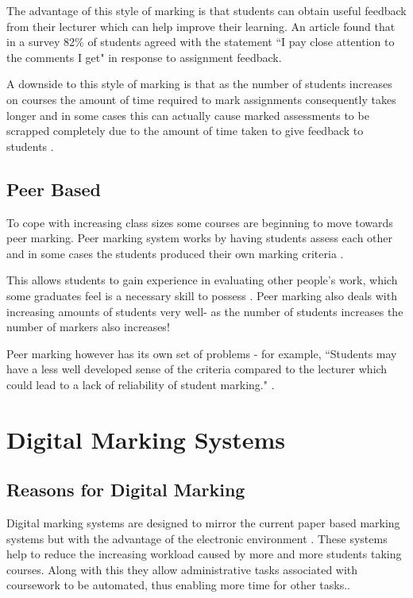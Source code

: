 \documentclass[11pt]{report}
\begin{document}
The advantage of this style of marking is that students can obtain useful feedback from their lecturer which can help improve their learning.  An article \cite{higgins_conscientious_2002-1} found that in a survey 82\% of students agreed with the statement ``I pay close attention to the comments I get" in response to assignment feedback.

A downside to this style of marking is that as the number of students increases on courses the amount of time required to mark assignments consequently takes longer and in some cases this can actually cause marked assessments to be scrapped completely due to the amount of time taken to give feedback to students \cite{brown_assessment_1999-8}.


\subsection{Peer Based}
To cope with increasing class sizes some courses are beginning to move towards peer marking. Peer marking system works by having students assess each other and in some cases  the students produced their own marking criteria \cite{orsmond_use_2000-1}.

This allows students to gain experience in evaluating other people's work, which some graduates feel is a necessary skill to possess \cite{langan_insights_????-1}. Peer marking also deals with increasing amounts of students very well- as the number of students increases the number of markers also increases!

Peer marking however has its own set of problems - for example, ``Students may have a less well developed sense of the criteria compared to the lecturer which could lead to a lack of reliability of student marking." \cite{orsmond_use_2000-1}.



\section{Digital Marking Systems}

\subsection{Reasons for Digital Marking}
Digital marking systems are designed to mirror the current paper based marking systems but with the advantage of the electronic environment \cite{heinrich_online_2003-1}. These systems help to reduce the increasing workload caused by more and more students taking courses. Along with this they allow administrative tasks associated with coursework to be automated, thus enabling more time for other tasks.\cite{joy_effective_1998-1}.
\end{document}
